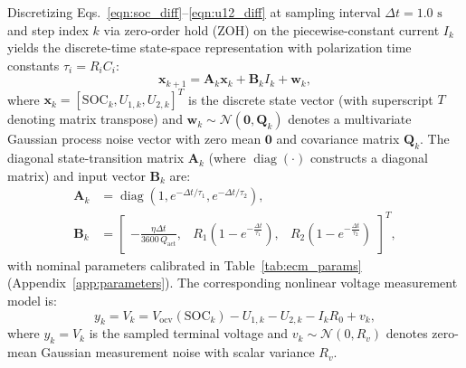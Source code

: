 \documentclass[10pt,a4paper]{article}
\begin{document}
Discretizing Eqs.~\eqref{eqn:soc_diff}--\eqref{eqn:u12_diff} at sampling interval $\Delta t = 1.0\text{ s}$ and step index $k$ via zero-order hold (ZOH) on the piecewise-constant current $I_k$ yields the discrete-time state-space representation with polarization time constants $\tau_i = R_i C_i$:
\begin{equation}\label{eqn:state_space_discrete}
\mathbf{x}_{k+1} = \mathbf{A}_k \mathbf{x}_k + \mathbf{B}_k I_k + \mathbf{w}_k,
\end{equation}
where $\mathbf{x}_k = [\text{SOC}_k, U_{1,k}, U_{2,k}]^T$ is the discrete state vector (with superscript $T$ denoting matrix transpose) and $\mathbf{w}_k \sim \mathcal{N}(\mathbf{0}, \mathbf{Q}_k)$ denotes a multivariate Gaussian process noise vector with zero mean $\mathbf{0}$ and covariance matrix $\mathbf{Q}_k$. The diagonal state-transition matrix $\mathbf{A}_k$ (where $\operatorname{diag}(\cdot)$ constructs a diagonal matrix) and input vector $\mathbf{B}_k$ are:
\begin{align}
\mathbf{A}_k &= \operatorname{diag}\left(1, e^{-\Delta t/\tau_1}, e^{-\Delta t/\tau_2}\right), \label{eqn:Ak_mat} \\
\mathbf{B}_k &= \begin{bmatrix}
-\frac{\eta \Delta t}{3600\,Q_{\text{act}}}, & R_1\left(1 - e^{-\frac{\Delta t}{\tau_1}}\right), & R_2\left(1 - e^{-\frac{\Delta t}{\tau_2}}\right)
\end{bmatrix}^T, \label{eqn:Bk_mat}
\end{align}
with nominal parameters calibrated in Table~\ref{tab:ecm_params} (Appendix~\ref{app:parameters}). The corresponding nonlinear voltage measurement model is:
\begin{equation}\label{eqn:measurement_eq}
y_k = V_k = V_{\text{ocv}}(\text{SOC}_k) - U_{1,k} - U_{2,k} - I_k R_0 + v_k,
\end{equation}
where $y_k = V_k$ is the sampled terminal voltage and $v_k \sim \mathcal{N}(0, R_v)$ denotes zero-mean Gaussian measurement noise with scalar variance $R_v$.
\end{document}
